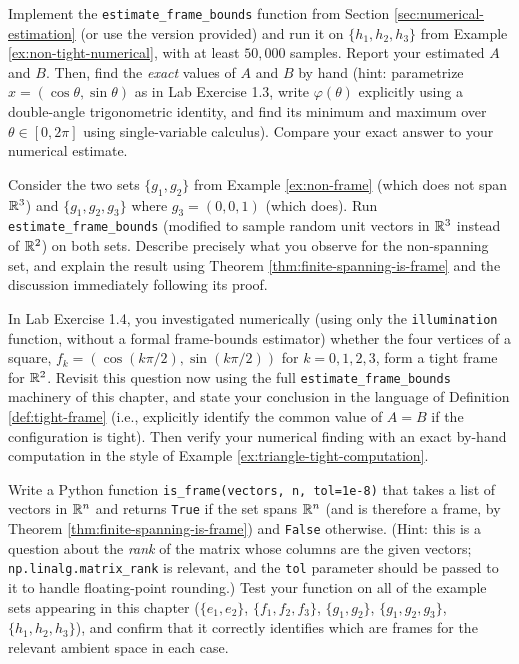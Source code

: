 \begin{exercisebox}[title={Lab Exercise 2.1: Confirming Example 2.6}]
Implement the \texttt{estimate\_frame\_bounds} function from Section \ref{sec:numerical-estimation} (or use the version provided) and run it on $\{h_1, h_2, h_3\}$ from Example \ref{ex:non-tight-numerical}, with at least $50{,}000$ samples. Report your estimated $A$ and $B$. Then, find the \emph{exact} values of $A$ and $B$ by hand (hint: parametrize $x = (\cos\theta, \sin\theta)$ as in Lab Exercise 1.3, write $\varphi(\theta)$ explicitly using a double-angle trigonometric identity, and find its minimum and maximum over $\theta \in [0, 2\pi]$ using single-variable calculus). Compare your exact answer to your numerical estimate.
\end{exercisebox}

\begin{exercisebox}[title={Lab Exercise 2.2: Spanning vs.\ Not Spanning, Numerically}]
Consider the two sets $\{g_1, g_2\}$ from Example \ref{ex:non-frame} (which does not span $\mathbb{R}^3$) and $\{g_1, g_2, g_3\}$ where $g_3 = (0,0,1)$ (which does). Run \texttt{estimate\_frame\_bounds} (modified to sample random unit vectors in $\mathbb{R}^3$ instead of $\mathbb{R}^2$) on both sets. Describe precisely what you observe for the non-spanning set, and explain the result using Theorem \ref{thm:finite-spanning-is-frame} and the discussion immediately following its proof.
\end{exercisebox}

\begin{exercisebox}[title={Lab Exercise 2.3: The Square Revisited}]
In Lab Exercise 1.4, you investigated numerically (using only the \texttt{illumination} function, without a formal frame-bounds estimator) whether the four vertices of a square, $f_k = (\cos(k\pi/2), \sin(k\pi/2))$ for $k=0,1,2,3$, form a tight frame for $\mathbb{R}^2$. Revisit this question now using the full \texttt{estimate\_frame\_bounds} machinery of this chapter, and state your conclusion in the language of Definition \ref{def:tight-frame} (i.e., explicitly identify the common value of $A=B$ if the configuration is tight). Then verify your numerical finding with an exact by-hand computation in the style of Example \ref{ex:triangle-tight-computation}.
\end{exercisebox}

\begin{exercisebox}[title={Lab Exercise 2.4: Building a Frame-Checker}]
Write a Python function \texttt{is\_frame(vectors, n, tol=1e-8)} that takes a list of vectors in $\mathbb{R}^n$ and returns \texttt{True} if the set spans $\mathbb{R}^n$ (and is therefore a frame, by Theorem \ref{thm:finite-spanning-is-frame}) and \texttt{False} otherwise. (Hint: this is a question about the \emph{rank} of the matrix whose columns are the given vectors; \texttt{np.linalg.matrix\_rank} is relevant, and the \texttt{tol} parameter should be passed to it to handle floating-point rounding.) Test your function on all of the example sets appearing in this chapter ($\{e_1,e_2\}$, $\{f_1,f_2,f_3\}$, $\{g_1,g_2\}$, $\{g_1,g_2,g_3\}$, $\{h_1,h_2,h_3\}$), and confirm that it correctly identifies which are frames for the relevant ambient space in each case.
\end{exercisebox}

